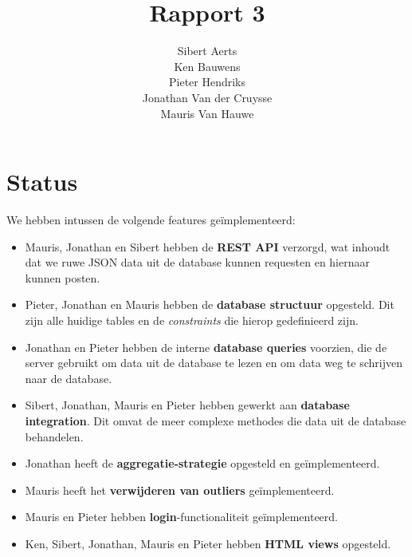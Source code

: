\documentclass[12pt,parskip=full]{article}
\begin{document}
\title{Rapport 3}
\author{Sibert Aerts \\ Ken Bauwens \\ Pieter Hendriks \\ Jonathan Van der Cruysse \\ Mauris Van Hauwe}
\maketitle

\newcommand{\code}[1]{\texttt{#1}}
%
\newcommand{\CS}{{C\#}}
\lstset{language=[Sharp]C,basicstyle=\ttfamily}

\section{Status}
We hebben intussen de volgende features ge\"implementeerd:

\begin{itemize}
\item Mauris, Jonathan en Sibert hebben de \textbf{REST API} verzorgd, wat
inhoudt dat we ruwe JSON data uit de database kunnen requesten en hiernaar
kunnen posten.

\item Pieter, Jonathan en Mauris hebben de \textbf{database structuur}
opgesteld. Dit zijn alle huidige tables en de \textit{constraints} die hierop gedefinieerd zijn.

\item Jonathan en Pieter hebben de interne \textbf{database queries} voorzien,
die de server gebruikt om data uit de database te lezen en om data weg te
schrijven naar de database.

\item Sibert, Jonathan, Mauris en Pieter hebben gewerkt aan \textbf{database
integration}. Dit omvat de meer complexe methodes die data uit de database
behandelen.

\item Jonathan heeft de \textbf{aggregatie-strategie} opgesteld en ge\"implementeerd.

\item Mauris heeft het \textbf{verwijderen van outliers} ge\"implementeerd.

\item Mauris en Pieter hebben \textbf{login}-functionaliteit ge\"implementeerd.

\item Ken, Sibert, Jonathan, Mauris en Pieter hebben \textbf{HTML views} opgesteld.

\end{itemize}
\end{document}
